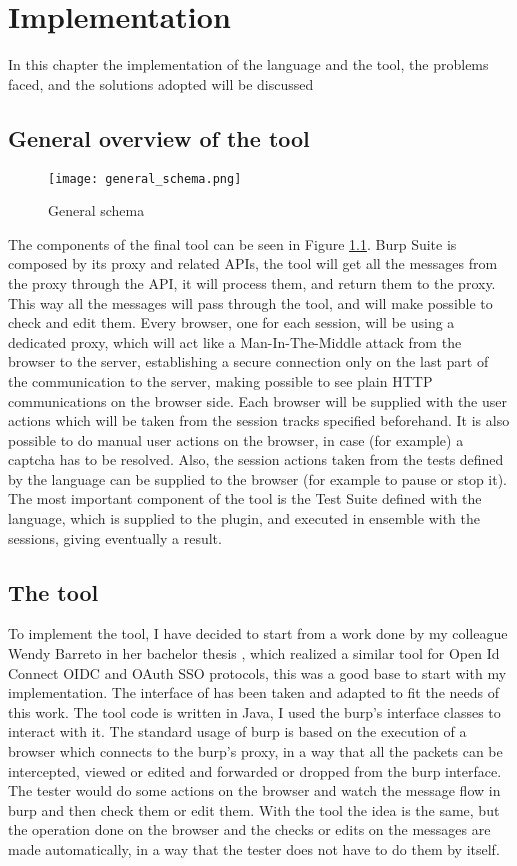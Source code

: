 \chapter{Implementation}
\label{chap:Implementation}
In this chapter the implementation of the language and the tool, the problems faced, and the solutions adopted will be discussed

\section{General overview of the tool}
\begin{figure}
    \texttt{[image: general\_schema.png]}
    \caption{General schema}
    \label{fig:general_schema}
\end{figure}

The components of the final tool can be seen in Figure \ref{fig:general_schema}. Burp Suite is composed by its proxy and related APIs, the tool will get all the messages from the proxy through the API, it will process them, and return them to the proxy. This way all the messages will pass through the tool, and will make possible to check and edit them.
Every browser, one for each session, will be using a dedicated proxy, which will act like a Man-In-The-Middle attack from the browser to the server, establishing a secure connection only on the last part of the communication to the server, making possible to see plain HTTP communications on the browser side. Each browser will be supplied with the user actions which will be taken from the session tracks specified beforehand. It is also possible to do manual user actions on the browser, in case (for example) a captcha has to be resolved. Also, the session actions taken from the tests defined by the language can be supplied to the browser (for example to pause or stop it). The most important component of the tool is the Test Suite defined with the language, which is supplied to the plugin, and executed in ensemble with the sessions, giving eventually a result.

\section{The tool}
To implement the tool, I have decided to start from a work done by my colleague Wendy Barreto in her bachelor thesis \cite{wendy_barreto}, which realized a similar tool for Open Id Connect \gls{OIDC} and \gls{OAuth} SSO protocols, this was a good base to start with my implementation. The interface of \cite{wendy_barreto} has been taken and adapted to fit the needs of this work. The tool code is written in Java, I used the \Gls{burp}'s interface classes to interact with it.
The standard usage of \Gls{burp} is based on the execution of a browser which connects to the \Gls{burp}'s proxy, in a way that all the packets can be intercepted, viewed or edited and forwarded or dropped from the \Gls{burp} interface. The tester would do some actions on the browser and watch the message flow in \Gls{burp} and then check them or edit them. With the tool the idea is the same, but the operation done on the browser and the checks or edits on the messages are made automatically, in a way that the tester does not have to do them by itself.

